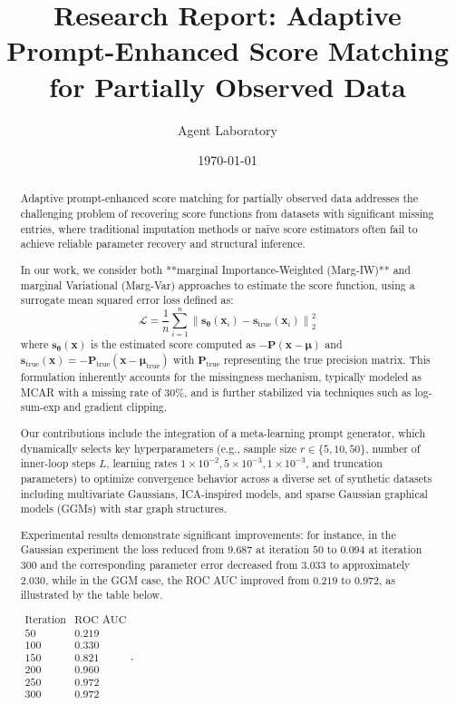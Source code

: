 \documentclass{article} %
\title{Research Report: Adaptive Prompt-Enhanced Score Matching for Partially Observed Data}
\author{Agent Laboratory}
\date{\today}
\begin{document}
\maketitle

\begin{abstract}
Adaptive prompt-enhanced score matching for partially observed data addresses the challenging problem of recovering score functions from datasets with significant missing entries, where traditional imputation methods or naïve score estimators often fail to achieve reliable parameter recovery and structural inference.

In our work, we consider both **marginal Importance-Weighted (Marg-IW)** and marginal Variational (Marg-Var) approaches to estimate the score function, using a surrogate mean squared error loss defined as:
$$
\mathcal{L} = \frac{1}{n}\sum_{i=1}^{n}\left\|\mathbf{s}_{\mathbf{\theta}}(\mathbf{x}_i) - \mathbf{s}_{\text{true}}(\mathbf{x}_i)\right\|_2^2
$$
where $\mathbf{s}_{\mathbf{\theta}}(\mathbf{x})$ is the estimated score computed as $-\mathbf{P}(\mathbf{x}-\mathbf{\mu})$ and $\mathbf{s}_{\text{true}}(\mathbf{x}) = -\mathbf{P}_{\text{true}}(\mathbf{x}-\mathbf{\mu}_{\text{true}})$ with $\mathbf{P}_{\text{true}}$ representing the true precision matrix. This formulation inherently accounts for the missingness mechanism, typically modeled as MCAR with a missing rate of 30\%, and is further stabilized via techniques such as log-sum-exp and gradient clipping.

Our contributions include the integration of a meta-learning prompt generator, which dynamically selects key hyperparameters (e.g., sample size $r \in \{5, 10, 50\}$, number of inner-loop steps $L$, learning rates $1\times10^{-2}, 5\times10^{-3}, 1\times10^{-3}$, and truncation parameters) to optimize convergence behavior across a diverse set of synthetic datasets including multivariate Gaussians, ICA-inspired models, and sparse Gaussian graphical models (GGMs) with star graph structures.

Experimental results demonstrate significant improvements: for instance, in the Gaussian experiment the loss reduced from $9.687$ at iteration $50$ to $0.094$ at iteration $300$ and the corresponding parameter error decreased from $3.033$ to approximately $2.030$, while in the GGM case, the ROC AUC improved from $0.219$ to $0.972$, as illustrated by the table below.

$\begin{array}{c|c}\text{Iteration} & \text{ROC AUC} \\ \hline 50 & 0.219 \\ 100 & 0.330 \\ 150 & 0.821 \\ 200 & 0.960 \\ 250 & 0.972 \\ 300 & 0.972 \end{array}$,


\end{abstract}
\end{document}

